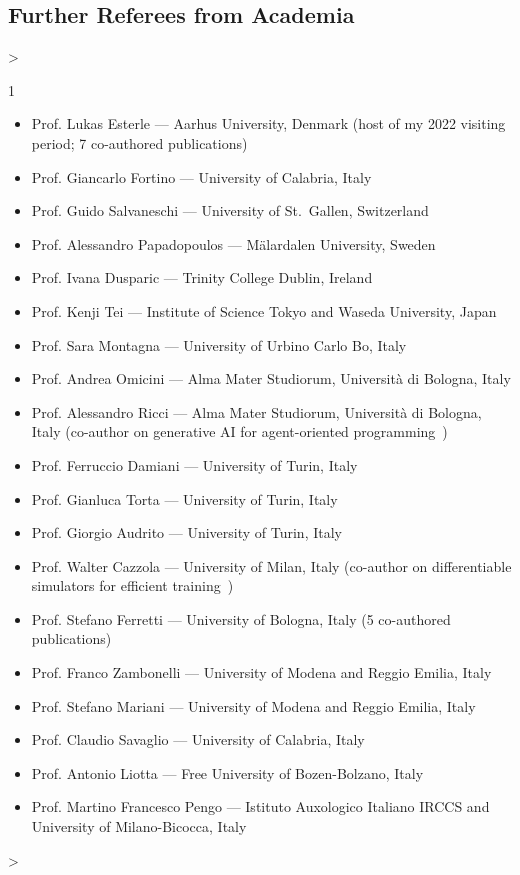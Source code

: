 \documentclass[10pt,a4paper,roman]{moderncv}        %
\makeatletter
\newenvironment{cvprose}%
  {\begin{list}{}{%
     \setlength{\leftmargin}{\dimexpr\hintscolumnwidth+\separatorcolumnwidth\relax}%
     \setlength{\rightmargin}{0pt}%
     \setlength{\listparindent}{0pt}%
     \setlength{\itemindent}{0pt}%
     \setlength{\labelwidth}{0pt}%
     \setlength{\topsep}{.25em}%
     \setlength{\parsep}{.5em}%
     \setlength{\partopsep}{0pt}}%
   \item\relax}%
  {\end{list}}
\newenvironment{cvlist}[1][2]%
  {\begin{cvprose}%
   \cvlist@cols=#1\relax
   \setlength{\multicolsep}{0pt}%
   \setlength{\columnsep}{1.2em}%
   \setlength{\columnwidth}{\linewidth}%
   \ifnum\cvlist@cols>\@ne\begin{multicols}{#1}\fi
   \begin{itemize}%
     \setlength{\itemsep}{.1ex}%
     \setlength{\parskip}{0pt}%
     \setlength{\topsep}{0pt}}%
  {\end{itemize}%
   \ifnum\cvlist@cols>\@ne\end{multicols}\fi
   \end{cvprose}}
\newcommand{\cvsubsection}[1]{\Needspace{4\baselineskip}\subsection{#1}}
\makeatother
\begin{document}
\cvsubsection{Further Referees from Academia}
\begin{cvlist}[1]
  \item Prof. Lukas Esterle --- Aarhus University, Denmark (host of my 2022 visiting period; 7 co-authored publications)
  \item Prof. Giancarlo Fortino --- University of Calabria, Italy
  \item Prof. Guido Salvaneschi --- University of St.\ Gallen, Switzerland
  \item Prof. Alessandro Papadopoulos --- Mälardalen University, Sweden
  \item Prof. Ivana Dusparic --- Trinity College Dublin, Ireland
  \item Prof. Kenji Tei --- Institute of Science Tokyo and Waseda University, Japan
  \item Prof. Sara Montagna --- University of Urbino Carlo Bo, Italy 
  \item Prof. Andrea Omicini --- Alma Mater Studiorum, Università di Bologna, Italy
  \item Prof. Alessandro Ricci --- Alma Mater Studiorum, Università di Bologna, Italy (co-author on generative AI for agent-oriented programming~)
  \item Prof. Ferruccio Damiani --- University of Turin, Italy
  \item Prof. Gianluca Torta --- University of Turin, Italy
  \item Prof. Giorgio Audrito --- University of Turin, Italy 
  \item Prof. Walter Cazzola --- University of Milan, Italy (co-author on differentiable simulators for efficient training~)
  \item Prof. Stefano Ferretti --- University of Bologna, Italy (5 co-authored publications)
  \item Prof. Franco Zambonelli --- University of Modena and Reggio Emilia, Italy
  \item Prof. Stefano Mariani --- University of Modena and Reggio Emilia, Italy
  \item Prof. Claudio Savaglio --- University of Calabria, Italy 
  \item Prof. Antonio Liotta --- Free University of Bozen-Bolzano, Italy
  \item Prof. Martino Francesco Pengo --- Istituto Auxologico Italiano IRCCS and University of Milano-Bicocca, Italy 
\end{cvlist}
\end{document}
